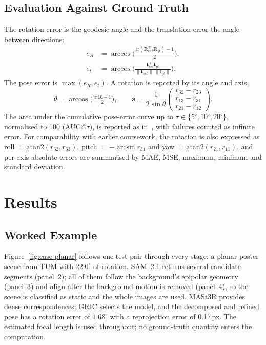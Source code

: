 \documentclass[10pt,a4paper,twocolumn]{article}
\newcommand{\R}{\mathbf{R}}
\newcommand{\tv}{\mathbf{t}}
\begin{document}
\subsection*{Evaluation Against Ground Truth}
The rotation error is the geodesic angle and the translation error the angle between directions:
\begin{align}
  e_R &= \arccos\!\Big(\tfrac{\mathrm{tr}(\R_{est}^\top\R_{gt})-1}{2}\Big),\\
  e_t &= \arccos\!\Big(\tfrac{\tv_{est}^\top\tv_{gt}}{\|\tv_{est}\|\,\|\tv_{gt}\|}\Big).
\end{align}
The pose error is $\max(e_R,e_t)$. A rotation is reported by its angle and axis,
\begin{equation}
  \theta=\arccos\!\Big(\tfrac{\mathrm{tr}\,\R-1}{2}\Big),\qquad \mathbf{a}=\frac{1}{2\sin\theta}\begin{pmatrix}r_{32}-r_{23}\\ r_{13}-r_{31}\\ r_{21}-r_{12}\end{pmatrix}.
\end{equation} The area under the cumulative pose-error curve up to $\tau\in\{5^\circ,10^\circ,20^\circ\}$, normalised to 100 (AUC@$\tau$), is reported as in~\cite{superglue,loftr}, with failures counted as infinite error. For comparability with earlier coursework, the rotation is also expressed as roll $=\mathrm{atan2}(r_{32},r_{33})$, pitch $=-\arcsin r_{31}$ and yaw $=\mathrm{atan2}(r_{21},r_{11})$, and per-axis absolute errors are summarised by MAE, MSE, maximum, minimum and standard deviation.

\section{Results}

\subsection{Worked Example}
Figure~\ref{fig:case-planar} follows one test pair through every stage: a planar poster scene from TUM with $22.0^\circ$ of rotation. SAM~2.1 returns several candidate segments (panel~2); all of them follow the background's epipolar geometry (panel~3) and align after the background motion is removed (panel~4), so the scene is classified as static and the whole images are used. MASt3R provides dense correspondences; GRIC selects the model, and the decomposed and refined pose has a rotation error of $1.68^\circ$ with a reprojection error of 0.17\,px. The estimated focal length is used throughout; no ground-truth quantity enters the computation.
\end{document}
